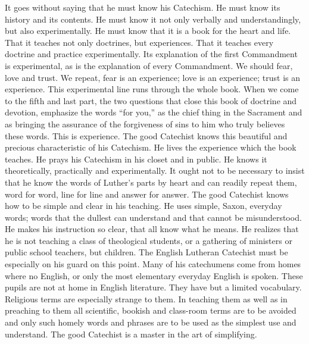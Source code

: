 It goes without saying that he must know his Catechism. He must know its history and its contents. He must know it not only verbally and understandingly, but also experimentally. He must know that it is a book for the heart and life. That it teaches not only doctrines, but experiences. That it teaches every doctrine and practice experimentally.
Its explanation of the first Commandment is experimental, as is the explanation of every Commandment. We should fear, love and trust. We repeat, fear is an experience; love is an experience; trust is an experience. This experimental line runs through the whole book. When we come to the fifth and last part, the two questions that close this book of doctrine and devotion, emphasize the words “for you,” as the chief thing in the Sacrament and as bringing the assurance of the forgiveness of sins to him who truly believes these words. This is experience. The good Catechist knows this beautiful and precious characteristic of his Catechism. He lives the experience which the book teaches. He prays his Catechism in his closet and in public. He knows it theoretically, practically and experimentally.  It ought not to be necessary to insist that he know the words of Luther’s parts by heart and can readily repeat them, word for word, line for line and answer for answer. The good Catechist knows how to be simple and clear in his teaching. He uses simple, Saxon, everyday words; words that the dullest can understand and that cannot be misunderstood. He makes his instruction so clear, that all know what he means. He realizes that he is not teaching a class of theological students, or a gathering of ministers or public school teachers, but children. The English Lutheran Catechist must be
 especially on his guard on this point. Many of his catechumens come from homes where no English, or only the most elementary everyday English is spoken. These pupils are not at home in English literature. They have but a limited vocabulary. Religious terms are especially strange to them. In teaching them as well as in preaching to them all scientific, bookish and class-room terms are to be avoided and only such homely words and phrases are to be used as the simplest use and understand. The good Catechist is a master in the art of simplifying.

